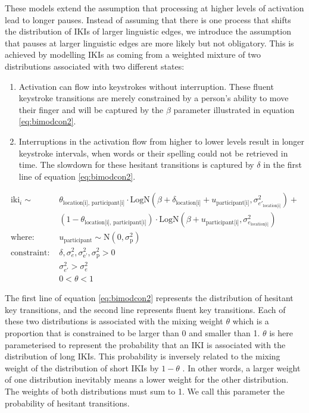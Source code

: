 \documentclass[
  english,
  man,floatsintext]{apa7}
\begin{document}
These models extend the assumption that processing at higher levels of activation lead to longer pauses. Instead of assuming that there is one process that shifts the distribution of IKIs of larger linguistic edges, we introduce the assumption that pauses at larger linguistic edges are more likely but not obligatory. This is achieved by modelling IKIs as coming from a weighted mixture of two distributions associated with two different states:

\begin{enumerate}
\def\labelenumi{\arabic{enumi}.}
\item
  Activation can flow into keystrokes without interruption. These fluent keystroke transitions are merely constrained by a person's ability to move their finger and will be captured by the \(\beta\) parameter illustrated in equation \ref{eq:bimodcon2}.
\item
  Interruptions in the activation flow from higher to lower levels result in longer keystroke intervals, when words or their spelling could not be retrieved in time. The slowdown for these hesitant transitions is captured by \(\delta\) in the first line of equation \ref{eq:bimodcon2}.
\end{enumerate}

\begin{equation}
\begin{aligned}
\label{eq:bimodcon2}
\text{iki}_{i} \sim\text{ } & \theta_\text{location[i], participant[i]} \cdot \text{LogN}(\beta + \delta_\text{location[i]} + u_\text{participant[i]}, \sigma_{e'_\text{location[i]}}^2) + \\
  & (1 - \theta_\text{location[i], participant[i]}) \cdot \text{LogN}(\beta + u_\text{participant[i]}, \sigma_{e_\text{location[i]}}^2)\\
\text{where: } & u_\text{participant} \sim \text{N}(0, \sigma_\text{p}^2) \\
\text{constraint: } & \delta, \sigma_{e}^2, \sigma_\text{e'}^2, \sigma_\text{p}^2>0\\
        & \sigma_{e'}^2 > \sigma_{e}^2\\
        & 0 < \theta < 1
\end{aligned}
\end{equation}

The first line of equation \ref{eq:bimodcon2} represents the distribution of hesitant key transitions, and the second line represents fluent key transitions. Each of these two distributions is associated with the mixing weight \(\theta\) which is a proportion that is constrained to be larger than 0 and smaller than 1. \(\theta\) is here parameterised to represent the probability that an IKI is associated with the distribution of long IKIs. This probability is inversely related to the mixing weight of the distribution of short IKIs by \(1-\theta\) . In other words, a larger weight of one distribution inevitably means a lower weight for the other distribution. The weights of both distributions must sum to 1. We call this parameter the probability of hesitant transitions.
\end{document}
